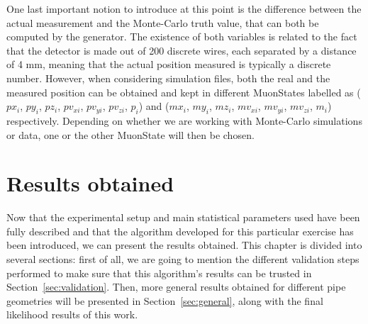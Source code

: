 \documentclass[a4paper, 11pt]{report}
\begin{document}
One last important notion to introduce at this point is the difference between the actual measurement and the Monte-Carlo truth value, that can both be computed by the generator. The existence of both variables is related to the fact that the detector is made out of 200 discrete wires, each separated by a distance of 4 mm, meaning that the actual position measured is typically a discrete number. However, when considering simulation files, both the real and the measured position can be obtained and kept in different MuonStates labelled as ($px_i$, $py_i$, $pz_i$, $pv_{xi}$, $pv_{yi}$, $pv_{zi}$, $p_i$) and ($mx_i$, $my_i$, $mz_i$, $mv_{xi}$, $mv_{yi}$, $mv_{zi}$, $m_i$) respectively. Depending on whether we are working with Monte-Carlo simulations or data, one or the other MuonState will then be chosen.












































\chapter{Results obtained}

Now that the experimental setup and main statistical parameters used have been fully described and that the algorithm developed for this particular exercise has been introduced, we can present the results obtained. This chapter is divided into several sections: first of all, we are going to mention the different validation steps performed to make sure that this algorithm's results can be trusted in Section~\ref{sec:validation}. Then, more general results obtained for different pipe geometries will be presented in Section~\ref{sec:general}, along with the final likelihood results of this work.
\end{document}
